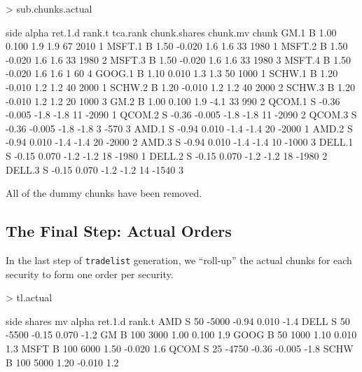 \documentclass{article}
\begin{document}
\begin{Schunk}
\begin{Sinput}
> sub.chunks.actual
\end{Sinput}
\begin{Soutput}
       side alpha ret.1.d rank.t tca.rank chunk.shares chunk.mv chunk
GM.1      B  1.00   0.100    1.9      1.9           67     2010     1
MSFT.1    B  1.50  -0.020    1.6      1.6           33     1980     1
MSFT.2    B  1.50  -0.020    1.6      1.6           33     1980     2
MSFT.3    B  1.50  -0.020    1.6      1.6           33     1980     3
MSFT.4    B  1.50  -0.020    1.6      1.6            1       60     4
GOOG.1    B  1.10   0.010    1.3      1.3           50     1000     1
SCHW.1    B  1.20  -0.010    1.2      1.2           40     2000     1
SCHW.2    B  1.20  -0.010    1.2      1.2           40     2000     2
SCHW.3    B  1.20  -0.010    1.2      1.2           20     1000     3
GM.2      B  1.00   0.100    1.9     -4.1           33      990     2
QCOM.1    S -0.36  -0.005   -1.8     -1.8           11    -2090     1
QCOM.2    S -0.36  -0.005   -1.8     -1.8           11    -2090     2
QCOM.3    S -0.36  -0.005   -1.8     -1.8            3     -570     3
AMD.1     S -0.94   0.010   -1.4     -1.4           20    -2000     1
AMD.2     S -0.94   0.010   -1.4     -1.4           20    -2000     2
AMD.3     S -0.94   0.010   -1.4     -1.4           10    -1000     3
DELL.1    S -0.15   0.070   -1.2     -1.2           18    -1980     1
DELL.2    S -0.15   0.070   -1.2     -1.2           18    -1980     2
DELL.3    S -0.15   0.070   -1.2     -1.2           14    -1540     3
\end{Soutput}
\end{Schunk}

All of the dummy chunks have been removed.

\subsection{The Final Step: Actual Orders}

In the last step of \texttt{tradelist} generation, we ``roll-up'' the
actual chunks for each security to form one order per security.


\begin{Schunk}
\begin{Sinput}
> tl.actual
\end{Sinput}
\begin{Soutput}
     side shares    mv alpha ret.1.d rank.t
AMD     S     50 -5000 -0.94   0.010   -1.4
DELL    S     50 -5500 -0.15   0.070   -1.2
GM      B    100  3000  1.00   0.100    1.9
GOOG    B     50  1000  1.10   0.010    1.3
MSFT    B    100  6000  1.50  -0.020    1.6
QCOM    S     25 -4750 -0.36  -0.005   -1.8
SCHW    B    100  5000  1.20  -0.010    1.2
\end{Soutput}
\end{Schunk}
\end{document}
